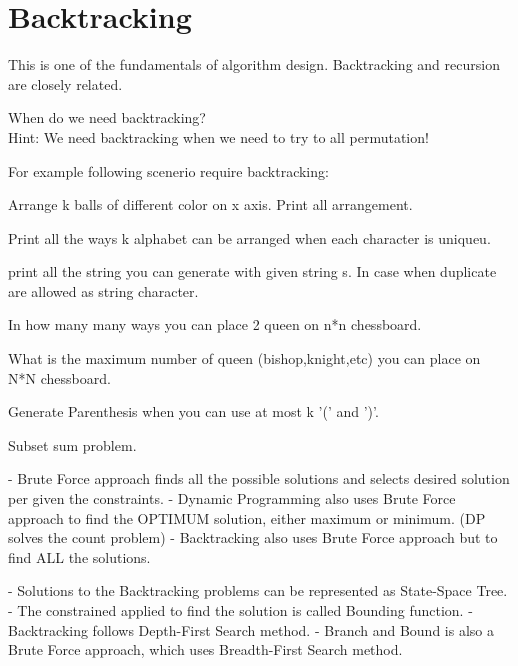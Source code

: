 \chapter{Backtracking}\label{chp:backtracking}

This is one of the fundamentals of algorithm design.
Backtracking and recursion are closely related.

\faQuestion \hspace{5mm} When do we need backtracking?\\
Hint: We need backtracking when we need to try to all permutation!

For example following scenerio require backtracking:
\begin{compactenum}[(i)]
    \item Arrange k balls of different color on x axis. Print all arrangement.
    \item Print all the ways k alphabet can be arranged when each character is uniqueu.
    \item print all the string you can generate with given string s. In case when duplicate are allowed as string character.
    \item In how many many ways you can place 2 queen on n*n chessboard.
    \item What is the maximum number of queen (bishop,knight,etc) you can place on N*N chessboard.
    \item Generate Parenthesis when you can use at most k '(' and ')'.
    \item Subset sum problem.
\end{compactenum}


\medskip
\begin{fullwidth}
\begin{code2}
- Brute Force approach finds all the possible solutions and selects desired solution per given the constraints.
- Dynamic Programming also uses Brute Force approach to find the OPTIMUM solution, either maximum or minimum. (DP solves the count problem)
- Backtracking also uses Brute Force approach but to find ALL the solutions.

- Solutions to the Backtracking problems can be represented as State-Space Tree.
- The constrained applied to find the solution is called Bounding function.
- Backtracking follows Depth-First Search method.
- Branch and Bound is also a Brute Force approach, which uses Breadth-First Search method.
\end{code2}
\end{fullwidth}


